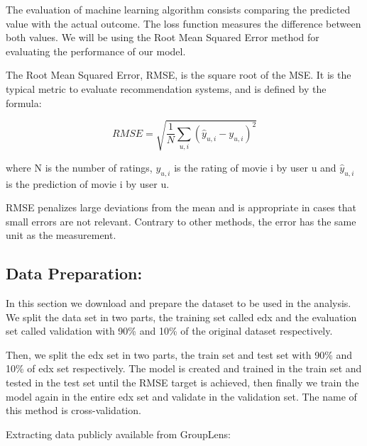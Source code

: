 \documentclass[
]{article}
\begin{document}
The evaluation of machine learning algorithm consists comparing the
predicted value with the actual outcome. The loss function measures the
difference between both values. We will be using the Root Mean Squared
Error method for evaluating the performance of our model.

The Root Mean Squared Error, RMSE, is the square root of the MSE. It is
the typical metric to evaluate recommendation systems, and is defined by
the formula:

\[RMSE=\sqrt{\frac{1}{N}\sum_{u,i}(\hat{y}_{u,i}-y_{u,i})^2}\]

where N is the number of ratings, \(y_{u,i}\) is the rating of movie i
by user u and \(\hat{y}_{u,i}\) is the prediction of movie i by user u.

RMSE penalizes large deviations from the mean and is appropriate in
cases that small errors are not relevant. Contrary to other methods, the
error has the same unit as the measurement.

\hypertarget{data-preparation}{%
\subsection{\texorpdfstring{\textbf{Data
Preparation:}}{Data Preparation:}}\label{data-preparation}}

In this section we download and prepare the dataset to be used in the
analysis. We split the data set in two parts, the training set called
edx and the evaluation set called validation with 90\% and 10\% of the
original dataset respectively.

Then, we split the edx set in two parts, the train set and test set with
90\% and 10\% of edx set respectively. The model is created and trained
in the train set and tested in the test set until the RMSE target is
achieved, then finally we train the model again in the entire edx set
and validate in the validation set. The name of this method is
cross-validation.

\newpage

Extracting data publicly available from GroupLens:
\end{document}
